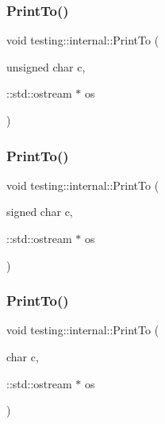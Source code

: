 \mbox{\label{namespacetesting_1_1internal_ab7524d6d3ab8c31b1deea88bf61783bb}} 
\subsubsection{\texorpdfstring{PrintTo()}{PrintTo()}\hspace{0.1cm}{\footnotesize\ttfamily [5/20]}}
{\footnotesize\ttfamily void testing\+::internal\+::\+Print\+To (\begin{DoxyParamCaption}\item[{unsigned char}]{c,  }\item[{\+::std\+::ostream $\ast$}]{os }\end{DoxyParamCaption})}

\mbox{\label{namespacetesting_1_1internal_ad453af399370e394881079c243abacb4}} 
\subsubsection{\texorpdfstring{PrintTo()}{PrintTo()}\hspace{0.1cm}{\footnotesize\ttfamily [6/20]}}
{\footnotesize\ttfamily void testing\+::internal\+::\+Print\+To (\begin{DoxyParamCaption}\item[{signed char}]{c,  }\item[{\+::std\+::ostream $\ast$}]{os }\end{DoxyParamCaption})}

\mbox{\label{namespacetesting_1_1internal_a476bd3d411d4f129620aaf8999c257c0}} 
\subsubsection{\texorpdfstring{PrintTo()}{PrintTo()}\hspace{0.1cm}{\footnotesize\ttfamily [7/20]}}
{\footnotesize\ttfamily void testing\+::internal\+::\+Print\+To (\begin{DoxyParamCaption}\item[{char}]{c,  }\item[{\+::std\+::ostream $\ast$}]{os }\end{DoxyParamCaption})\hspace{0.3cm}{\ttfamily [inline]}}

